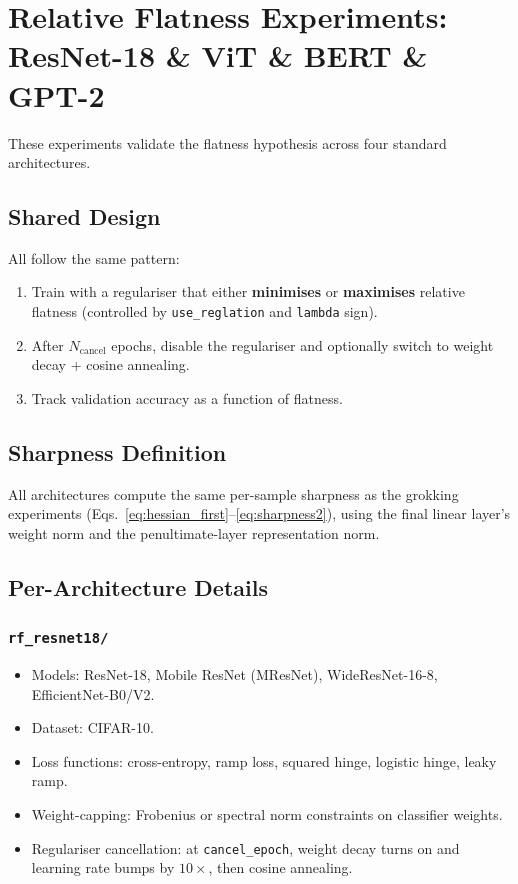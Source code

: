 \documentclass[11pt,a4paper]{article}
\theoremstyle{definition}
\begin{document}
\section{Relative Flatness Experiments: ResNet-18 \& ViT \& BERT \& GPT-2}

These experiments validate the flatness hypothesis across four standard architectures.

\subsection{Shared Design}
All follow the same pattern:
\begin{enumerate}[leftmargin=*]
    \item Train with a regulariser that either \textbf{minimises} or \textbf{maximises} relative flatness
          (controlled by \texttt{use\_reglation} and \texttt{lambda} sign).
    \item After $N_{\text{cancel}}$ epochs, disable the regulariser and optionally switch to
          weight decay + cosine annealing.
    \item Track validation accuracy as a function of flatness.
\end{enumerate}

\subsection{Sharpness Definition}
All architectures compute the same per-sample sharpness as the grokking experiments
(Eqs.~\ref{eq:hessian_first}--\ref{eq:sharpness2}), using the final linear layer's weight norm
and the penultimate-layer representation norm.

\subsection{Per-Architecture Details}

\subsubsection*{\texttt{rf\_resnet18/}}
\begin{itemize}[leftmargin=*]
    \item Models: ResNet-18, Mobile ResNet (MResNet), WideResNet-16-8, EfficientNet-B0/V2.
    \item Dataset: CIFAR-10.
    \item Loss functions: cross-entropy, ramp loss, squared hinge, logistic hinge, leaky ramp.
    \item Weight-capping: Frobenius or spectral norm constraints on classifier weights.
    \item Regulariser cancellation: at \texttt{cancel\_epoch}, weight decay turns on and learning
          rate bumps by $10\times$, then cosine annealing.
\end{itemize}
\end{document}
